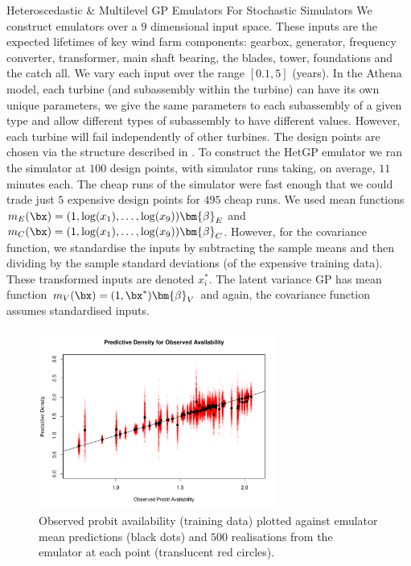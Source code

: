 \begin{chapter}{Heteroscedastic \& Multilevel GP Emulators For Stochastic Simulators\label{Ch:Hetsml}}
We construct emulators over a $9$ dimensional input space. These inputs are the expected lifetimes of key wind farm components: gearbox, generator, frequency converter, transformer, main shaft bearing, the blades, tower, foundations and the catch all. We vary each input over the range $[0.1, 5]$ (years). In the Athena model, each turbine (and subassembly within the turbine) can have its own unique parameters, we give the same parameters to each subassembly of a given type and allow different types of subassembly to have different values. However, each turbine will fail independently of other turbines. The design points are chosen via the structure described in . To construct the HetGP emulator we ran the simulator at $100$ design points, with simulator runs taking, on average, $11$ minutes each. The cheap runs of the simulator were fast enough that we could trade just $5$ expensive design points for $495$ cheap runs. We used mean functions $m_E(\bx) = (1, \log(x_1), \ldots, \log(x_9))\bm{\beta}_E$ and $m_C(\bx) = (1, \log(x_1), \ldots, \log(x_9))\bm{\beta}_C$.  However, for the covariance function, we standardise the inputs by subtracting the sample means and then dividing by the sample standard deviations (of the expensive training data). These transformed inputs are denoted $x_i^*$. The latent variance GP has mean function $m_V(\bx) = (1, \bx^*)\bm{\beta}_V$ and again, the covariance function assumes standardised inputs.

\begin{figure}
	\centering
	\includegraphics[width=0.7\textwidth]{sml-het-fig/obs-pred.pdf}
	\caption{Observed probit availability (training data) plotted against emulator mean predictions (black dots) and $500$ realisations from the emulator at each point (translucent red circles).}
	\label{Fig:within-sample}
\end{figure}


\end{chapter}

